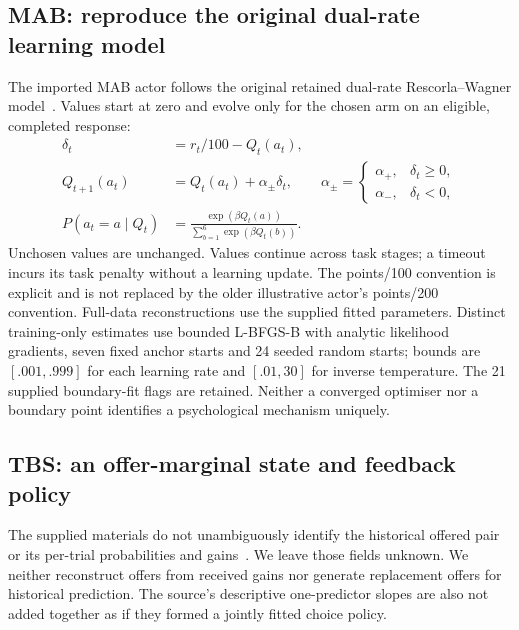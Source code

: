\documentclass[11pt,a4paper]{article}
\begin{document}
\subsection{MAB: reproduce the original dual-rate learning model}
The imported MAB actor follows the original retained dual-rate Rescorla--Wagner model~\cite{handover}. Values start at zero and evolve only for the chosen arm on an eligible, completed response:
\begin{align}
\delta_t &= r_t/100-Q_t(a_t),\\
Q_{t+1}(a_t) &= Q_t(a_t)+\alpha_{\pm}\delta_t,
\qquad
\alpha_{\pm}=\begin{cases}\alpha_+,&\delta_t\geq0,\\\alpha_-,&\delta_t<0,\end{cases}\\
P(a_t=a\mid Q_t) &= \frac{\exp(\beta Q_t(a))}{\sum_{b=1}^{6}\exp(\beta Q_t(b))}.
\end{align}
Unchosen values are unchanged. Values continue across task stages; a timeout incurs its task penalty without a learning update. The points/100 convention is explicit and is not replaced by the older illustrative actor's points/200 convention. Full-data reconstructions use the supplied fitted parameters. Distinct training-only estimates use bounded L-BFGS-B with analytic likelihood gradients, seven fixed anchor starts and 24 seeded random starts; bounds are $[.001,.999]$ for each learning rate and $[.01,30]$ for inverse temperature. The 21 supplied boundary-fit flags are retained. Neither a converged optimiser nor a boundary point identifies a psychological mechanism uniquely.

\subsection{TBS: an offer-marginal state and feedback policy}
The supplied materials do not unambiguously identify the historical offered pair or its per-trial probabilities and gains~\cite{handover}. We leave those fields unknown. We neither reconstruct offers from received gains nor generate replacement offers for historical prediction. The source's descriptive one-predictor slopes are also not added together as if they formed a jointly fitted choice policy.
\end{document}
